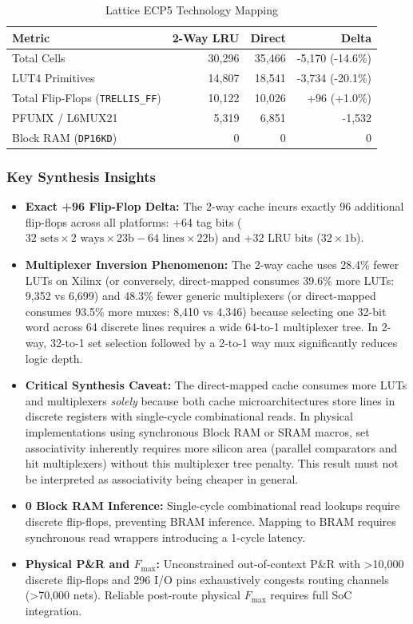 \documentclass[journal,10pt,twocolumn]{IEEEtran}
\begin{document}
\begin{table}[htbp]
\centering
\caption{Lattice ECP5 Technology Mapping}
\label{tab:ecp5_synth}
\begin{tabular}{lrrr}
\toprule
\textbf{Metric} & \textbf{2-Way LRU} & \textbf{Direct} & \textbf{Delta} \\
\midrule
Total Cells & 30,296 & 35,466 & -5,170 (-14.6\%) \\
LUT4 Primitives & 14,807 & 18,541 & -3,734 (-20.1\%) \\
Total Flip-Flops (\texttt{TRELLIS\_FF}) & 10,122 & 10,026 & +96 (+1.0\%) \\
PFUMX / L6MUX21 & 5,319 & 6,851 & -1,532 \\
Block RAM (\texttt{DP16KD}) & 0 & 0 & 0 \\
\bottomrule
\end{tabular}
\end{table}

\subsubsection{Key Synthesis Insights}
\begin{itemize}
    \item \textbf{Exact +96 Flip-Flop Delta:} The 2-way cache incurs exactly 96 additional flip-flops across all platforms: +64 tag bits ($32\text{ sets} \times 2\text{ ways} \times 23\text{b} - 64\text{ lines} \times 22\text{b}$) and +32 LRU bits ($32 \times 1\text{b}$).
    \item \textbf{Multiplexer Inversion Phenomenon:} The 2-way cache uses 28.4\% fewer LUTs on Xilinx (or conversely, direct-mapped consumes 39.6\% more LUTs: 9,352 vs 6,699) and 48.3\% fewer generic multiplexers (or direct-mapped consumes 93.5\% more muxes: 8,410 vs 4,346) because selecting one 32-bit word across 64 discrete lines requires a wide 64-to-1 multiplexer tree. In 2-way, 32-to-1 set selection followed by a 2-to-1 way mux significantly reduces logic depth.
    \item \textbf{Critical Synthesis Caveat:} The direct-mapped cache consumes more LUTs and multiplexers \textit{solely} because both cache microarchitectures store lines in discrete registers with single-cycle combinational reads. In physical implementations using synchronous Block RAM or SRAM macros, set associativity inherently requires more silicon area (parallel comparators and hit multiplexers) without this multiplexer tree penalty. This result must not be interpreted as associativity being cheaper in general.
    \item \textbf{0 Block RAM Inference:} Single-cycle combinational read lookups require discrete flip-flops, preventing BRAM inference. Mapping to BRAM requires synchronous read wrappers introducing a 1-cycle latency.
    \item \textbf{Physical P\&R and $F_{\max}$:} Unconstrained out-of-context P\&R with >10,000 discrete flip-flops and 296 I/O pins exhaustively congests routing channels (>70,000 nets). Reliable post-route physical $F_{\max}$ requires full SoC integration.
\end{itemize}
\end{document}
